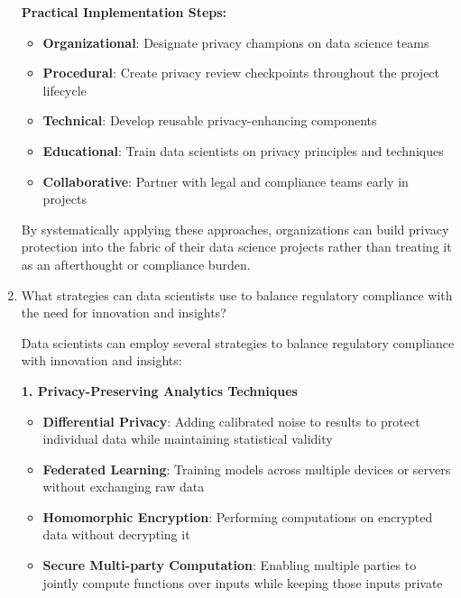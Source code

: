 \documentclass[12pt]{article}
\begin{document}
\begin{enumerate}
\begin{tcolorbox}[colback=blue!5!white,colframe=blue!75!black,title={Solution}]
    \textbf{Practical Implementation Steps:}
    \begin{itemize}
        \item \textbf{Organizational}: Designate privacy champions on data science teams
        \item \textbf{Procedural}: Create privacy review checkpoints throughout the project lifecycle
        \item \textbf{Technical}: Develop reusable privacy-enhancing components
        \item \textbf{Educational}: Train data scientists on privacy principles and techniques
        \item \textbf{Collaborative}: Partner with legal and compliance teams early in projects
    \end{itemize}
    
    By systematically applying these approaches, organizations can build privacy protection into the fabric of their data science projects rather than treating it as an afterthought or compliance burden.
    \end{tcolorbox}
    
    \item What strategies can data scientists use to balance regulatory compliance with the need for innovation and insights?
    
    \begin{tcolorbox}[colback=blue!5!white,colframe=blue!75!black,title={Solution}]
    Data scientists can employ several strategies to balance regulatory compliance with innovation and insights:
    
    \textbf{1. Privacy-Preserving Analytics Techniques}
    \begin{itemize}
        \item \textbf{Differential Privacy}: Adding calibrated noise to results to protect individual data while maintaining statistical validity
        \item \textbf{Federated Learning}: Training models across multiple devices or servers without exchanging raw data
        \item \textbf{Homomorphic Encryption}: Performing computations on encrypted data without decrypting it
        \item \textbf{Secure Multi-party Computation}: Enabling multiple parties to jointly compute functions over inputs while keeping those inputs private
    \end{itemize}
    

\end{tcolorbox}
\end{enumerate}
\end{document}
